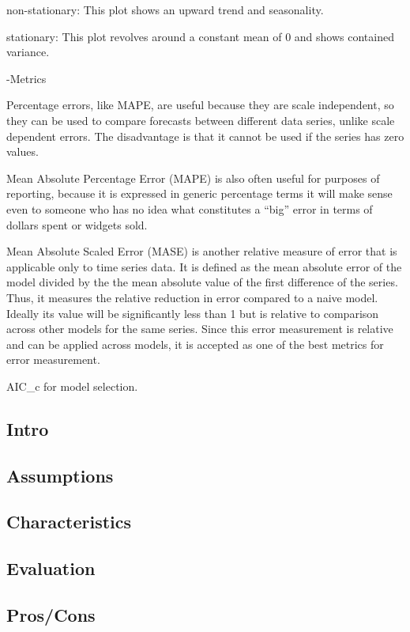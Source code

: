 \documentclass[]{book}
\theoremstyle{definition}
\theoremstyle{definition}
\theoremstyle{definition}
\theoremstyle{remark}
\begin{document}
non-stationary: This plot shows an upward trend and seasonality.

stationary: This plot revolves around a constant mean of 0 and shows
contained variance.

-Metrics

Percentage errors, like MAPE, are useful because they are scale
independent, so they can be used to compare forecasts between different
data series, unlike scale dependent errors. The disadvantage is that it
cannot be used if the series has zero values.

Mean Absolute Percentage Error (MAPE) is also often useful for purposes
of reporting, because it is expressed in generic percentage terms it
will make sense even to someone who has no idea what constitutes a
``big'' error in terms of dollars spent or widgets sold.

Mean Absolute Scaled Error (MASE) is another relative measure of error
that is applicable only to time series data. It is defined as the mean
absolute error of the model divided by the the mean absolute value of
the first difference of the series. Thus, it measures the relative
reduction in error compared to a naive model. Ideally its value will be
significantly less than 1 but is relative to comparison across other
models for the same series. Since this error measurement is relative and
can be applied across models, it is accepted as one of the best metrics
for error measurement.

AIC\_c for model selection.

\subsection{Intro}\label{intro-18}

\subsection{Assumptions}\label{assumptions-18}

\subsection{Characteristics}\label{characteristics-13}

\subsection{Evaluation}\label{evaluation-17}

\subsection{Pros/Cons}\label{proscons-18}
\end{document}
